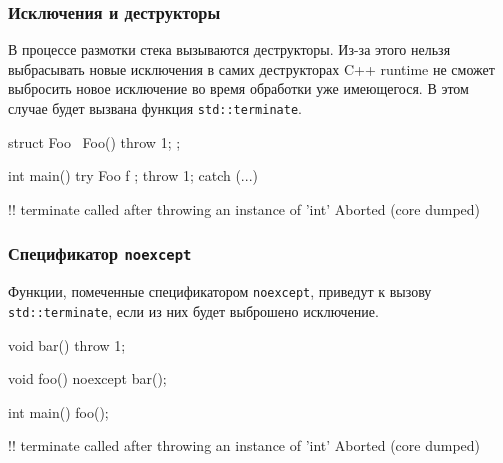 \documentclass[compress, 8pt, aspectratio=169]{beamer}
\begin{document}
  \begin{frame}[fragile]

    \frametitle{Исключения и деструкторы}

    В процессе размотки стека вызываются деструкторы.
    Из-за этого нельзя выбрасывать новые исключения в самих
    деструкторах \textemdash \space C++ runtime не сможет
    выбросить новое исключение во время обработки уже имеющегося.
    В этом случае будет вызвана функция \texttt{std::terminate}\footnotemark{}.


    \begin{myinplacelisting}[minted language=cpp]
struct Foo { ~Foo() { throw 1; } };

int main() {
  try { Foo f {}; throw 1; }
  catch (...) {}
}
    \end{myinplacelisting}

    \begin{terminalwindow}
!!
terminate called after throwing an instance of 'int'
Aborted (core dumped)
    \end{terminalwindow}

  \end{frame}

  \begin{frame}[fragile]

    \frametitle{Спецификатор \texttt{noexcept}}

    Функции, помеченные спецификатором \texttt{noexcept},
    приведут к вызову \texttt{std::terminate}, если из них
    будет выброшено исключение.

    \begin{myinplacelisting}[minted language=cpp]
void bar() { throw 1; }

void foo() noexcept { bar(); }

int main() { foo(); }
    \end{myinplacelisting}

    \begin{terminalwindow}
!!
terminate called after throwing an instance of 'int'
Aborted (core dumped)
    \end{terminalwindow}

  \end{frame}
\end{document}
